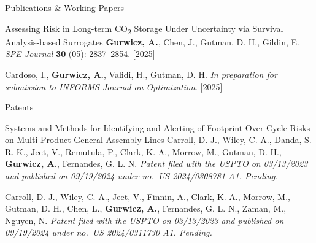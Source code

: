 \begin{cvcontentsection}{Publications \& Working Papers}

\cvpublication
    {Assessing Risk in Long-term CO\textsubscript{2} Storage Under Uncertainty via Survival Analysis-based Surrogates}
    {\textbf{Gurwicz, A.}, Chen, J., Gutman, D. H., Gildin, E.}
    {\textit{SPE Journal} \textbf{30} (05): 2837--2854. }
    [2025]

    {Cardoso, I., \textbf{Gurwicz, A.}, Validi, H., Gutman, D. H.}
    {\textit{In preparation for submission to INFORMS Journal on Optimization}.}
    [2025]

\end{cvcontentsection}

\begin{cvcontentsection}{Patents}

\cvpublication
    {Systems and Methods for Identifying and Alerting of Footprint Over-Cycle Risks on Multi-Product General Assembly
    Lines}
    {Carroll, D. J., Wiley, C. A., Danda, S. R. K., Jeet, V., Remutula, P., Clark, K. A., Morrow, M., Gutman, D. H.,
    \textbf{Gurwicz, A.}, Fernandes, G. L. N.}
    {\textit{Patent filed with the USPTO on 03/13/2023 and published on 09/19/2024 under no.\ US 2024/0308781 A1. Pending.}}

    {Carroll, D. J., Wiley, C. A., Jeet, V., Finnin, A., Clark, K. A., Morrow, M., Gutman, D. H., Chen, L.,
    \textbf{Gurwicz, A.}, Fernandes, G. L. N., Zaman, M., Nguyen, N.}
    {\textit{Patent filed with the USPTO on 03/13/2023 and published on 09/19/2024 under no.\ US 2024/0311730 A1. Pending.}}

\end{cvcontentsection}

